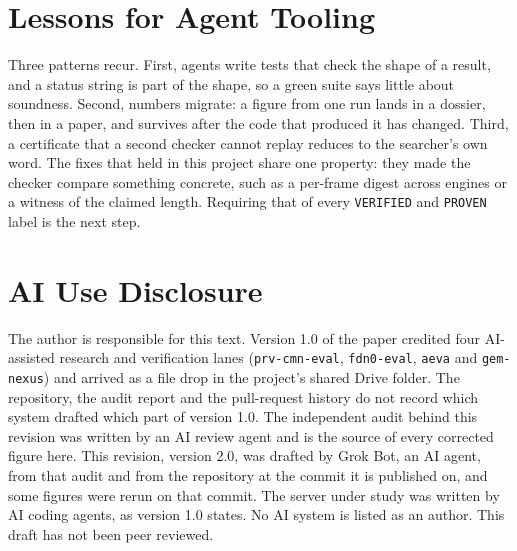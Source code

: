 \documentclass[11pt,a4paper]{article}
\begin{document}
\section{Lessons for Agent Tooling}

Three patterns recur. First, agents write tests that check the shape of a result, and a status string is part of the shape, so a green suite says little about soundness. Second, numbers migrate: a figure from one run lands in a dossier, then in a paper, and survives after the code that produced it has changed. Third, a certificate that a second checker cannot replay reduces to the searcher's own word. The fixes that held in this project share one property: they made the checker compare something concrete, such as a per-frame digest across engines or a witness of the claimed length. Requiring that of every \texttt{VERIFIED} and \texttt{PROVEN} label is the next step.

\section*{AI Use Disclosure}

The author is responsible for this text. Version 1.0 of the paper credited four AI-assisted research and verification lanes (\texttt{prv-cmn-eval}, \texttt{fdn0-eval}, \texttt{aeva} and \texttt{gem-nexus}) and arrived as a file drop in the project's shared Drive folder. The repository, the audit report and the pull-request history do not record which system drafted which part of version 1.0. The independent audit behind this revision was written by an AI review agent and is the source of every corrected figure here. This revision, version 2.0, was drafted by Grok Bot, an AI agent, from that audit and from the repository at the commit it is published on, and some figures were rerun on that commit. The server under study was written by AI coding agents, as version 1.0 states. No AI system is listed as an author. This draft has not been peer reviewed.
\end{document}
